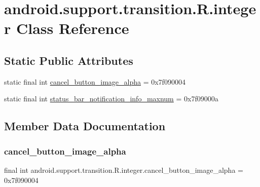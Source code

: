 \hypertarget{classandroid_1_1support_1_1transition_1_1R_1_1integer}{}\section{android.\+support.\+transition.\+R.\+integer Class Reference}
\label{classandroid_1_1support_1_1transition_1_1R_1_1integer}
\subsection*{Static Public Attributes}
\begin{DoxyCompactItemize}
\item 
static final int \mbox{\hyperlink{classandroid_1_1support_1_1transition_1_1R_1_1integer_abe6d06b5e7becf0db2eb20bf1110016b}{cancel\+\_\+button\+\_\+image\+\_\+alpha}} = 0x7f090004
\item 
static final int \mbox{\hyperlink{classandroid_1_1support_1_1transition_1_1R_1_1integer_a16b7d2020f81686d87ad20ae20652f64}{status\+\_\+bar\+\_\+notification\+\_\+info\+\_\+maxnum}} = 0x7f09000a
\end{DoxyCompactItemize}


\subsection{Member Data Documentation}
\mbox{\label{classandroid_1_1support_1_1transition_1_1R_1_1integer_abe6d06b5e7becf0db2eb20bf1110016b}} 
\subsubsection{\texorpdfstring{cancel\+\_\+button\+\_\+image\+\_\+alpha}{cancel\_button\_image\_alpha}}
{\footnotesize\ttfamily final int android.\+support.\+transition.\+R.\+integer.\+cancel\+\_\+button\+\_\+image\+\_\+alpha = 0x7f090004\hspace{0.3cm}{\ttfamily [static]}}


